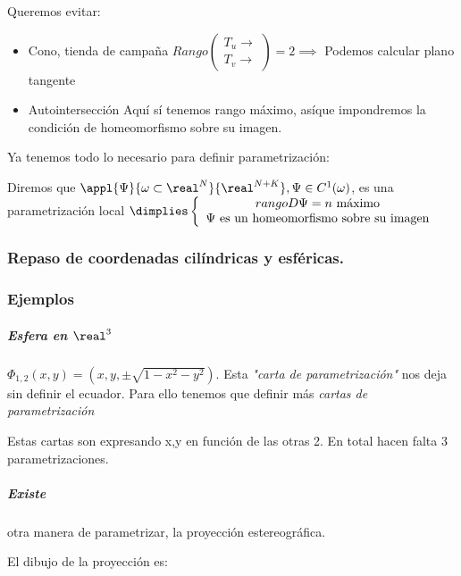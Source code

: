 Queremos evitar:

\begin{itemize}
\item Cono, tienda de campaña
$Rango \begin{pmatrix}
T_u \rightarrow\\
T_v \rightarrow
\end{pmatrix} = 2 \implies $ Podemos calcular plano tangente
\item Autointersección
Aquí sí tenemos rango máximo, asíque impondremos la condición de homeomorfismo sobre su imagen.
\end{itemize}

Ya tenemos todo lo necesario para definir parametrización:

\begin{defn} \label{defParametrizacion}
Diremos que $\appl{\Psi}{\omega \subset \real^N}{\real^{N+K}}, \Psi \in C^1(\omega)$, es una parametrización local $\dimplies \left\{ \begin{array}{c}
 rango D\Psi = n \text{ máximo}\\
 \Psi \text{ es un homeomorfismo sobre su imagen}
\end{array}\right.$
\end{defn}



\subsubsection{Repaso de coordenadas cilíndricas y esféricas.}


\subsubsection{Ejemplos}

\subparagraph{Esfera en $\real^3$}
 $\Phi_{1,2}(x,y) = (x,y,\pm \sqrt{1-x^2-y^2})$. Esta \emph{"carta de parametrización"} nos deja sin definir el ecuador. Para ello tenemos que definir más \emph{cartas de parametrización} 
 
 Estas cartas son expresando x,y en función de las otras 2. En total hacen falta 3 parametrizaciones.
 
 \subparagraph{Existe} otra manera de parametrizar, la proyección estereográfica.  

El dibujo de la proyección es:

 
 
